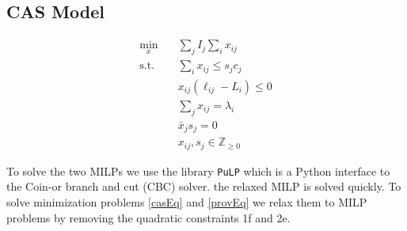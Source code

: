 \subsection{CAS Model}
    \begin{subequations}
    \begin{align}
    \underset{x}{\min} \quad & \sum_j I_j\sum_i x_{ij} \\
    \text{s.t.}  \quad & \sum_i x_{ij} \leq s_jc_j \\
    & x_{ij}\left(\ell_{ij}-L_i\right) \leq 0 \\
    & \sum_j x_{ij} = \lambda_i \\
    & \bar{x}_js_j=0 \\
    & x_{ij},s_j \in\mathbb{Z}_{\geq 0}
    \end{align}
    \label{casEq}
\end{subequations}

To solve the two MILPs we use the library \texttt{PuLP} which is a Python interface to the Coin-or branch and cut (CBC) solver. the relaxed MILP is solved quickly. 
To solve minimization problems \ref{casEq} and \ref{provEq} we relax them to MILP problems by removing the quadratic constraints 1f and 2e. 


